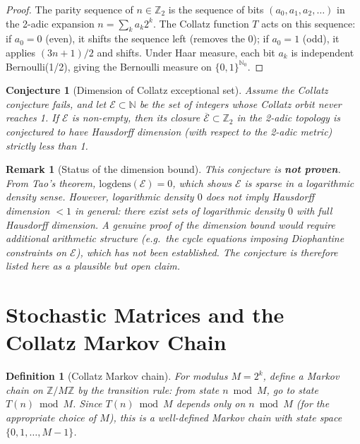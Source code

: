 \documentclass[12pt,a4paper]{article}
\newtheorem{definition}[theorem]{Definition}
\newtheorem{remark}[theorem]{Remark}
\newtheorem{conjecture}[theorem]{Conjecture}
\begin{document}
\begin{proof}
The parity sequence of $n \in \mathbb{Z}_2$ is the sequence of bits $(a_0, a_1, a_2, \ldots)$
in the 2-adic expansion $n = \sum_k a_k 2^k$. The Collatz function $T$ acts on this
sequence: if $a_0 = 0$ (even), it shifts the sequence left (removes the 0);
if $a_0 = 1$ (odd), it applies $(3n+1)/2$ and shifts. Under Haar measure, each bit
$a_k$ is independent Bernoulli(1/2), giving the Bernoulli measure on $\{0,1\}^{\mathbb{N}_0}$.
\end{proof}

\begin{conjecture}[Dimension of Collatz exceptional set]\label{conj:dimension}
Assume the Collatz conjecture fails, and let $\mathcal{E} \subset \mathbb{N}$ be the set
of integers whose Collatz orbit never reaches 1. If $\mathcal{E}$ is non-empty, then
its closure $\overline{\mathcal{E}} \subset \mathbb{Z}_2$ in the 2-adic topology is
conjectured to have Hausdorff dimension (with respect to the 2-adic metric) strictly
less than 1.
\end{conjecture}

\begin{remark}[Status of the dimension bound]
This conjecture is \textbf{not proven}.  From Tao's theorem, $\mathrm{logdens}(\mathcal{E}) = 0$,
which shows $\mathcal{E}$ is sparse in a logarithmic density sense.  However,
\emph{logarithmic density $0$ does not imply Hausdorff dimension $< 1$ in general}:
there exist sets of logarithmic density $0$ with full Hausdorff dimension.  A genuine
proof of the dimension bound would require additional arithmetic structure (e.g.\ the
cycle equations imposing Diophantine constraints on $\mathcal{E}$), which has not been
established.  The conjecture is therefore listed here as a plausible but open claim.
\end{remark}

\section{Stochastic Matrices and the Collatz Markov Chain}

\begin{definition}[Collatz Markov chain]\label{def:markov}
For modulus $M = 2^k$, define a Markov chain on $\mathbb{Z}/M\mathbb{Z}$ by the
transition rule: from state $n \bmod M$, go to state $T(n) \bmod M$.
Since $T(n) \bmod M$ depends only on $n \bmod M$ (for the appropriate choice of $M$),
this is a well-defined Markov chain with state space $\{0, 1, \ldots, M-1\}$.
\end{definition}
\end{document}

